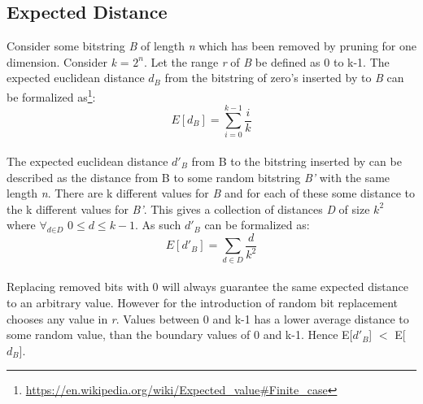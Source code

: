 \subsection{Expected Distance}
\label{exp:dist}
Consider some bitstring \textit{B} of length \textit{n} which has been removed by \qs{} pruning for one dimension. Consider \textit{k} = $2^n$. Let the range \textit{r} of \textit{B} be defined as 0 to k-1. The expected euclidean distance \textit{$d_B$} from the bitstring of zero's inserted by \qs{} to \textit{B} can be formalized as\footnote{\url{https://en.wikipedia.org/wiki/Expected_value\#Finite_case}}:
\\
$$E[\textit{$d_B$}] = \sum_{i=0}^{k - 1} \dfrac{i}{k}$$
\\
The expected euclidean distance \textit{$d'_B$} from B to the bitstring inserted by \qsr{} can be described as the distance from B to some random bitstring \textit{B'} with the same length \textit{n}. There are k different values for \textit{B} and for each of these some distance to the k different values for \textit{B'}. This gives a collection of distances \textit{D} of size $k^2$ where $\forall{}_{\textit{d}\in{}\textit{D}}$ $0\leq{}d\leq{}k-1$. As such \textit{$d'_B$} can be formalized as:
\\
$$E[\textit{$d'_B$}] = \sum_{d\in\textit{D}}^{}\dfrac{d}{k^2}$$
\\
Replacing removed bits with 0 will always guarantee the same expected distance to an arbitrary value. However for \qsr{} the introduction of random bit replacement chooses any value in \textit{r}. Values between 0 and k-1 has a lower average distance to some random value, than the boundary values of 0 and k-1. Hence E[\textit{$d'_B$}] $<$ E[\textit{$d_B$}].